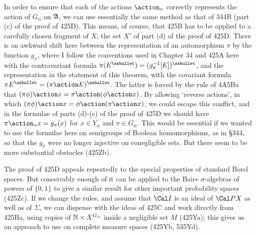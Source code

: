 {In order to ensure that each of the actions $\action_{\alpha}$ correctly
represents the action of $G_{\alpha}$ on $\frak A$, we can use essentially
the same method as that of 344B (part (c) of the proof of 425D).
This means, of course, that 425B has to be applied to a carefully chosen
fragment of $X$, the set $X'$ of part (d) of the proof of 425D.
There is an awkward shift here between the representation of an
automorphism $\pi$ by the function $g_{\pi}$, where I follow the
conventions used in Chapter 34 and 425A here with the contravariant formula
$\pi(E^{\ssbullet})=(g_{\pi}^{-1}[E])^{\ssbullet}$,
and the representation in the statement of this theorem, 
with the covariant formula
$\pi E^{\ssbullet}=(\pi\action E)^{\ssbullet}$.   The latter is
forced by the rule of 4A5Ba that
$(\pi\phi)\action x=\pi\action(\phi\action x)$.   By allowing `reverse
actions', in which $(\pi\phi)\action x=\phi\action(\pi\action x)$, we could
escape this conflict, and in the formulae of parts (d)-(e)
of the proof of
425D we should have $\pi\action_{\alpha}x=g_{\pi}(x)$ for $x\in Y_{\alpha}$
and $\pi\in G_{\alpha}$.   This would be essential if we wanted to use
the formulae here on semigroups of Boolean homomorphisms, as in \S344,
so that the $g_{\pi}$ were no longer injective on conegligible sets.   But
there seem to be more substantial obstacles (425Zb).

The proof of 425D appeals repeatedly to the special properties of standard
Borel spaces.   But conceivably enough of it can be applied to the Baire
$\sigma$-algebras of powers of $\{0,1\}$
to give a similar result for other important probability spaces (425Zc).
If we change the rules, and assume that $\Cal I$ is an ideal of $\Cal PX$
as well as of $\Sigma$,
we can dispense with the ideas of 425C and work directly from 425Ba,
using copies of
$\Bbb N\times X^{G_{\alpha}}$ inside a negligible set $M$ (425Ya);
this gives us an approach to use on complete measure spaces (425Yb,
535Yd).

}
